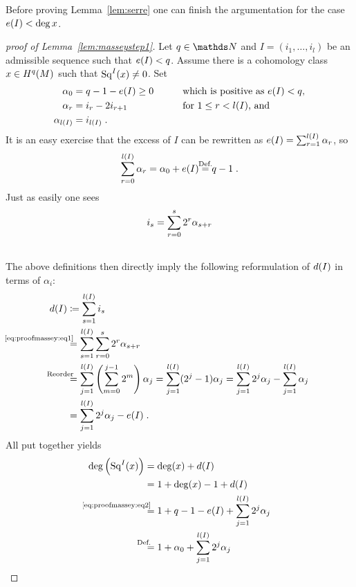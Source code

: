Before proving Lemma~\ref{lem:serre} one can finish the argumentation for
the case $e(I)<\deg x$.
\begin{proof}[proof of Lemma~\ref{lem:masseystep1}]
  Let $q\in\Nat$ and $I=(i_1,\dotsc,i_l)$ be an admissible sequence such that
  $e(I)<q$.
  Assume there is a cohomology class $x\in H^q(M)$ such that $\mathrm{Sq}^{I}(x)\neq0$.
  Set
  \begin{alignat*}{4}
    \alpha_0 &= q-1-e(I)\geq 0 &\qquad&\text{which is positive as $e(I)<q$,} \\
    \alpha_r &= i_{r}-2i_{r+1}  &&\text{for $1\leq r< l(I)$, and} \\ 
    \alpha_{l(I)} &= i_{l(I)}
    \;.
  \end{alignat*}
  It is an easy exercise that the excess of $I$ can be rewritten as
  $e(I)=\sum_{r=1}^{l(I)}\alpha_r$, so
  \begin{gather}\label{eq:alpha0}
    \sum_{r=0}^{\l(I)}\alpha_r = \alpha_0 + \e(I) \cequalsby{Def.} q-1
    \;.
  \end{gather}
  Just as easily one sees
  \begin{align}\label{eq:proofmassey:eq1}
    i_s
    &= \sum_{r=0}^{s}2^r\alpha_{s+r}\\\notag
  \end{align}
  The above definitions then directly imply the following reformulation
  of $d(I)$ in terms of $\alpha_i$:
  \begin{align}\notag
    \d(I)
    &\coloneqq \sum_{s=1}^{\l(I)}i_s  \\
    &\equalsby{\eqref{eq:proofmassey:eq1}}
      \sum_{s=1}^{\l(I)}\sum_{r=0}^{s}2^r\alpha_{s+r}\\\notag
    &\equalsby{Reorder} \sum_{j=1}^{\l(I)}
      \left(\sum_{m=0}^{j-1}2^m\right)\alpha_j
      = \sum_{j=1}^{\l(I)}(2^j-1)\alpha_j 
      = \sum_{j=1}^{\l(I)}2^j\alpha_j
      - \sum_{j=1}^{\l(I)}\alpha_j\\
    \label{eq:proofmassey:eq2}
    &= \sum_{j=1}^{\l(I)}2^j\alpha_j
      - \e(I)
      \;.
  \end{align}
  All put together yields
  \begin{align*}
    \deg\left(\Sq I(x)\right)
    &= \deg(x) + \d(I)\\
    &= 1 + \deg(x) -1 +\d(I) \\
    &\equalsby{\eqref{eq:proofmassey:eq2}}
      1 + q - 1 - \e(I) + \sum_{j=1}^{\l(I)}2^j\alpha_j \\
    &\equalsby{Def.}
      1 + \alpha_0 + \sum_{j=1}^{\l(I)}2^j\alpha_j \\

\end{align*}
\end{proof}
